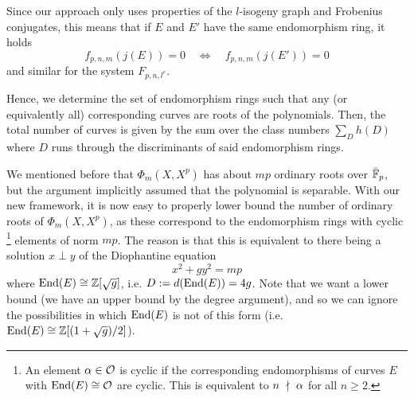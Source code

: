 Since our approach only uses properties of the $l$-isogeny graph and Frobenius conjugates, this means that if $E$ and $E'$ have the same endomorphism ring, it holds
\begin{equation*}
    f_{p, n, m}(j(E)) = 0 \quad \Leftrightarrow \quad f_{p, n, m}(j(E')) = 0
\end{equation*}
and similar for the system $F_{p, n, l^e}$.

Hence, we determine the set of endomorphism rings such that any (or equivalently all) corresponding curves are roots of the polynomials.
Then, the total number of curves is given by the sum over the class numbers $\sum_D h(D)$ where $D$ runs through the discriminants of said endomorphism rings. 

We mentioned before that $\Phi_m(X, X^p)$ has about $mp$ ordinary roots over $\bar{\mathbb{F}}_p$, but the argument implicitly assumed that the polynomial is separable.
With our new framework, it is now easy to properly lower bound the number of ordinary roots of $\Phi_m(X, X^p)$, as these correspond to the endomorphism rings with cyclic
\footnote{An element $\alpha \in \mathcal{O}$ is cyclic if the corresponding endomorphisms of curves $E$ with $\mathrm{End}(E) \cong \mathcal{O}$ are cyclic. This is equivalent to $n \ \nmid \  \alpha$ for all $n \geq 2$.}
elements of norm $mp$. 
The reason is that this is equivalent to there being a solution $x \perp y$ of the Diophantine equation
\begin{equation*}
    x^2 + g y^2 = m p
\end{equation*}
where $\mathrm{End}(E) \cong \mathbb{Z}[\sqrt{g}]$, i.e. $D := d(\mathrm{End}(E)) = 4g$.
Note that we want a lower bound (we have an upper bound by the degree argument), and so we can ignore the possibilities in which $\mathrm{End}(E)$ is not of this form (i.e. $\mathrm{End}(E) \cong \mathbb{Z}[(1 + \sqrt{g})/2]$).

